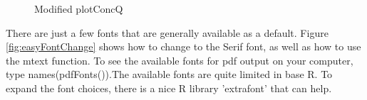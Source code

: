 \documentclass[a4paper,11pt]{article}\usepackage[]{graphicx}\usepackage[]{color}
\newenvironment{knitrout}{}{} %
\begin{document}
\begin{knitrout}
\begin{figure}[]
\caption[Modified plotConcQ]{Modified plotConcQ\label{fig:plotConcQComparison}}
\end{figure}


\end{knitrout}

There are just a few fonts that are generally available as a default. Figure \ref{fig:easyFontChange} shows how to change to the Serif font, as well as how to use the mtext function. To see the available fonts for pdf output on your computer, type names(pdfFonts()).The available fonts are quite limited in base R. To expand the font choices, there is a nice R library 'extrafont' that can help.
\end{document}
